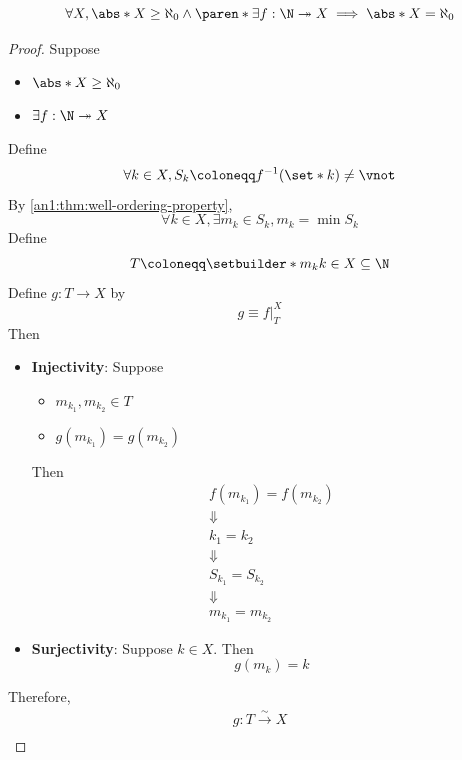 \begin{theorem} \label{an1:thm:surjection-from-N}
  \[
    \forall X, \abs*{X} \geq \aleph_{0} \land \paren*{\exists f: \N \twoheadrightarrow X}
    \implies \abs*{X} = \aleph_{0}
  \]
\end{theorem}

\begin{proof}
  Suppose
  \begin{itemize}
    \item $\abs*{X} \geq \aleph_{0}$
    \item $\exists f: \N \twoheadrightarrow X$
  \end{itemize}
  Define
  \[
    \forall k \in X, S_{k} \coloneqq f^{-1}(\set*{k}) \neq \vnot
  \]
  By \cref{an1:thm:well-ordering-property},
  \[
    \forall k \in X, \exists m_{k} \in S_{k}, m_{k} = \min S_{k}
  \]
  Define
  \[
    T \coloneqq \setbuilder*{m_{k}}{k \in X} \subseteq \N
  \]
  Define $g: T \to X$ by
  \[
    g \equiv f|_{T}^{X}
  \]
  Then
  \begin{itemize}
    \item \textbf{Injectivity}: Suppose
          \begin{itemize}
            \item $m_{k_{1}}, m_{k_{2}} \in T$
            \item $g(m_{k_{1}}) = g(m_{k_{2}})$
          \end{itemize}
          Then
          \[
            \begin{array}{c}
              f(m_{k_{1}}) = f(m_{k_{2}}) \\
              \Downarrow                  \\
              k_{1} = k_{2}               \\
              \Downarrow                  \\
              S_{k_{1}} = S_{k_{2}}       \\
              \Downarrow                  \\
              m_{k_{1}} = m_{k_{2}}
            \end{array}
          \]
    \item \textbf{Surjectivity}: Suppose $k \in X$. Then
          \[
            g(m_{k}) = k
          \]
  \end{itemize}
  Therefore,
  \[
    \begin{array}{c}
      g: T \xrightarrow{\sim} X                                                                                          \\

\end{array}\]
\end{proof}
